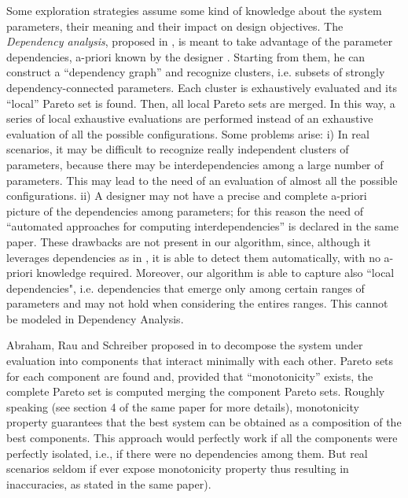 Some exploration strategies assume some kind of knowledge about
the system parameters, their meaning and their impact on design objectives.
The \emph{Dependency analysis}, proposed in \cite{givargis_tvlsi02}, is meant
to take advantage of the parameter dependencies, a-priori known by the designer . Starting from them, he can construct a
``dependency graph'' and recognize clusters, i.e. subsets of strongly
dependency-connected parameters. Each cluster is exhaustively evaluated
and its ``local'' Pareto set is found. Then, all local Pareto sets
are merged. In this way, a series of local exhaustive evaluations
are performed instead of an exhaustive evaluation of all the possible
configurations. Some problems arise: i) In real scenarios, it may
be difficult to recognize really independent clusters of parameters,
because there may be interdependencies among a large number of
parameters. This may lead to the need of an evaluation of
almost all the possible configurations. ii) A designer may not have
a precise and complete a-priori picture of the dependencies among parameters;
for this reason the need of ``automated approaches for computing interdependencies'' is declared in the same paper. 
These drawbacks are not present in our algorithm, since, although it leverages dependencies as in \cite{givargis_tvlsi02}, it is able to detect them automatically, with no a-priori knowledge required. Moreover, our algorithm is able to capture also ``local dependencies", i.e. dependencies that
emerge only among certain ranges of parameters and may not hold when considering the entires ranges. This cannot be modeled in Dependency Analysis. 

Abraham, Rau and Schreiber proposed in \cite{santosh_hptr00} to decompose
the system under evaluation into components that interact minimally
with each other. Pareto sets for each component are found and, provided
that ``monotonicity'' exists, the complete Pareto set is computed
merging the component Pareto sets. Roughly speaking (see section 4
of the same paper for more details), monotonicity property guarantees
that the best system can be obtained as a composition of the best
components. This approach would perfectly work if all the components
were perfectly isolated, i.e., if there were no dependencies among
them. But real scenarios seldom if ever
expose monotonicity property thus resulting in inaccuracies, as stated in the same paper).

